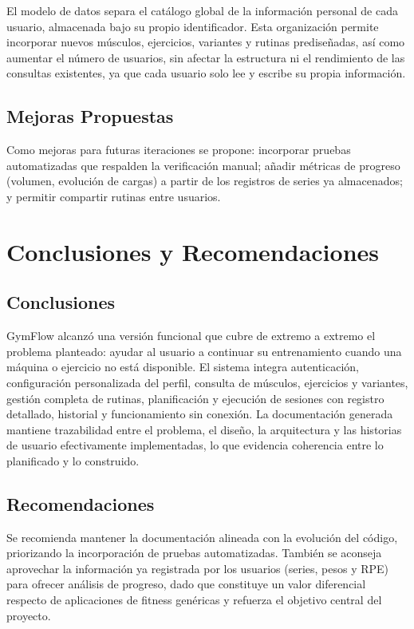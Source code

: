 \documentclass[12pt,letterpaper]{article}
\begin{document}
El modelo de datos separa el catálogo global de la información personal de cada usuario, almacenada bajo su propio identificador. Esta organización permite incorporar nuevos músculos, ejercicios, variantes y rutinas prediseñadas, así como aumentar el número de usuarios, sin afectar la estructura ni el rendimiento de las consultas existentes, ya que cada usuario solo lee y escribe su propia información.

\subsection{Mejoras Propuestas}

Como mejoras para futuras iteraciones se propone: incorporar pruebas automatizadas que respalden la verificación manual; añadir métricas de progreso (volumen, evolución de cargas) a partir de los registros de series ya almacenados; y permitir compartir rutinas entre usuarios.

\section{Conclusiones y Recomendaciones}

\subsection{Conclusiones}

GymFlow alcanzó una versión funcional que cubre de extremo a extremo el problema planteado: ayudar al usuario a continuar su entrenamiento cuando una máquina o ejercicio no está disponible. El sistema integra autenticación, configuración personalizada del perfil, consulta de músculos, ejercicios y variantes, gestión completa de rutinas, planificación y ejecución de sesiones con registro detallado, historial y funcionamiento sin conexión. La documentación generada mantiene trazabilidad entre el problema, el diseño, la arquitectura y las historias de usuario efectivamente implementadas, lo que evidencia coherencia entre lo planificado y lo construido.

\subsection{Recomendaciones}

Se recomienda mantener la documentación alineada con la evolución del código, priorizando la incorporación de pruebas automatizadas. También se aconseja aprovechar la información ya registrada por los usuarios (series, pesos y RPE) para ofrecer análisis de progreso, dado que constituye un valor diferencial respecto de aplicaciones de fitness genéricas y refuerza el objetivo central del proyecto.
\end{document}
